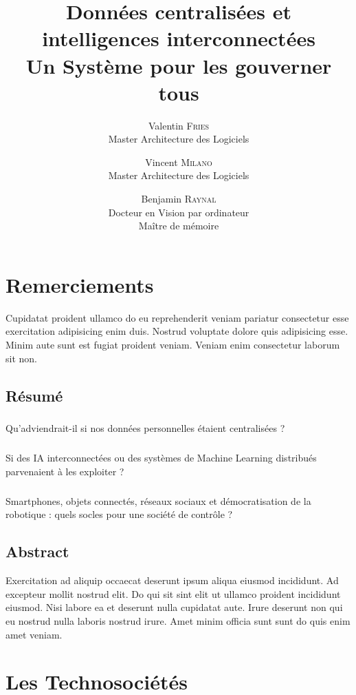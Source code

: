 \documentclass{report}
\title{
    \huge Données centralisées et intelligences interconnectées \\
    \LARGE Un Système pour les gouverner tous
}
\author{
    Valentin \textsc{Fries} \\ Master Architecture des Logiciels 
    \and
    Vincent \textsc{Milano} \\ Master Architecture des Logiciels
    \and
    Benjamin \textsc{Raynal} \\ Docteur en Vision par ordinateur \\ Maître de mémoire
}
\begin{document}
\maketitle

\newpage
\chapter*{Remerciements}
Cupidatat proident ullamco do eu reprehenderit veniam pariatur consectetur esse exercitation adipisicing enim duis. Nostrud voluptate dolore quis adipisicing esse. Minim aute sunt est fugiat proident veniam. Veniam enim consectetur laborum sit non.

\newpage 
\section*{Résumé}
    \paragraph{} Qu'adviendrait-il si nos données personnelles étaient centralisées ?
    \paragraph{} Si des IA interconnectées ou des systèmes de Machine Learning distribués parvenaient à les exploiter ?
    \paragraph{} Smartphones, objets connectés, réseaux sociaux et démocratisation de la robotique : quels socles pour une société de contrôle ?

\newpage
\section*{Abstract}
Exercitation ad aliquip occaecat deserunt ipsum aliqua eiusmod incididunt. Ad excepteur mollit nostrud elit. Do qui sit sint elit ut ullamco proident incididunt eiusmod. Nisi labore ea et deserunt nulla cupidatat aute. Irure deserunt non qui eu nostrud nulla laboris nostrud irure. Amet minim officia sunt sunt do quis enim amet veniam.

\newpage
\tableofcontents

\newpage
{}

\chapter{Les Technosociétés}
\end{document}
